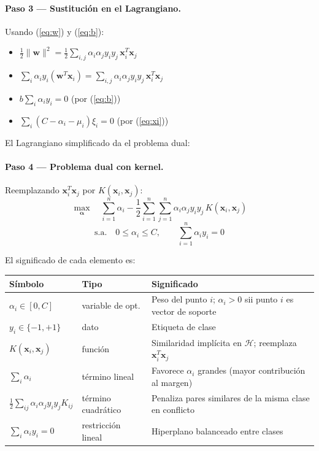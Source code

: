 \documentclass[spanish]{article}
\begin{document}
\paragraph{Paso 3 — Sustitución en el Lagrangiano.} Usando (\ref{eq:w}) y (\ref{eq:b}):
\begin{itemize}
    \item $\frac{1}{2}\|\mathbf{w}\|^2 = \frac{1}{2}\sum_{i,j}\alpha_i\alpha_j y_i y_j\,\mathbf{x}_i^T\mathbf{x}_j$
    \item $\sum_i\alpha_i y_i(\mathbf{w}^T\mathbf{x}_i) = \sum_{i,j}\alpha_i\alpha_j y_i y_j\,\mathbf{x}_i^T\mathbf{x}_j$
    \item $b\sum_i\alpha_i y_i = 0$ (por (\ref{eq:b}))
    \item $\sum_i(C - \alpha_i - \mu_i)\xi_i = 0$ (por (\ref{eq:xi}))
\end{itemize}
El Lagrangiano simplificado da el problema dual:

\paragraph{Paso 4 — Problema dual con kernel.} Reemplazando $\mathbf{x}_i^T\mathbf{x}_j$ por $K(\mathbf{x}_i,\mathbf{x}_j)$:
\begin{equation}
\max_{\boldsymbol{\alpha}} \quad \sum_{i=1}^{n}\alpha_i - \frac{1}{2}\sum_{i=1}^{n}\sum_{j=1}^{n}\alpha_i\alpha_j y_i y_j\, K(\mathbf{x}_i,\mathbf{x}_j)
\end{equation}
\begin{equation*}
\text{s.a.} \quad 0 \leq \alpha_i \leq C, \qquad \sum_{i=1}^{n}\alpha_i y_i = 0
\end{equation*}

El significado de cada elemento es:

\begin{center}
\begin{tabular}{lll}
\toprule
\textbf{Símbolo} & \textbf{Tipo} & \textbf{Significado} \\
\midrule
$\alpha_i \in [0,C]$ & variable de opt. & Peso del punto $i$; $\alpha_i>0$ sii punto $i$ es vector de soporte \\
$y_i \in \{-1,+1\}$ & dato & Etiqueta de clase \\
$K(\mathbf{x}_i,\mathbf{x}_j)$ & función & Similaridad implícita en $\mathcal{H}$; reemplaza $\mathbf{x}_i^T\mathbf{x}_j$ \\
$\sum_i\alpha_i$ & término lineal & Favorece $\alpha_i$ grandes (mayor contribución al margen) \\
$\frac{1}{2}\sum_{ij}\alpha_i\alpha_j y_i y_j K_{ij}$ & término cuadrático & Penaliza pares similares de la misma clase en conflicto \\
$\sum_i\alpha_i y_i = 0$ & restricción lineal & Hiperplano balanceado entre clases \\
\bottomrule
\end{tabular}
\end{center}
\end{document}

